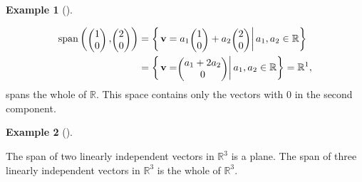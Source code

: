 \documentclass[
  a4paper,
  DIV=11,
  numbers=noendperiod,
  oneside]{scrreprt}
\theoremstyle{definition}
\newtheorem{example}{Example}[chapter]
\theoremstyle{remark}
\begin{document}
\begin{example}[]\protect\hypertarget{exm-}{}\label{exm-}

\[\begin{aligned}
{\rm span}\left(\scriptscriptstyle \begin{pmatrix}   1\\0  \end{pmatrix} \textstyle,\scriptscriptstyle \begin{pmatrix}   2\\0  \end{pmatrix} \textstyle\right) & = \left\{ \left. {\bf v}  =a_1 \scriptscriptstyle \begin{pmatrix}   1\\0  \end{pmatrix} \textstyle + a_2 \scriptscriptstyle \begin{pmatrix}   2\\0  \end{pmatrix} \textstyle\right| a_1,a_2 \in \mathbb{R} \right\} \\
&=  \left\{ \left.{\bf v} =  \scriptscriptstyle \begin{pmatrix}   a_1+2a_2 \\ 0  \end{pmatrix} \textstyle \right| a_1,a_2 \in \mathbb{R} \right\}  =  \mathbb{R}^{1},
\end{aligned}\] spans the whole of \(\mathbb{R}\). This space contains
only the vectors with 0 in the second component.

\end{example}

\begin{example}[]\protect\hypertarget{exm-}{}\label{exm-}

The span of two linearly independent vectors in \(\mathbb{R}^{3}\) is a
plane. The span of three linearly independent vectors in
\(\mathbb{R}^{3}\) is the whole of \(\mathbb{R}^{3}\).

\end{example}
\end{document}
